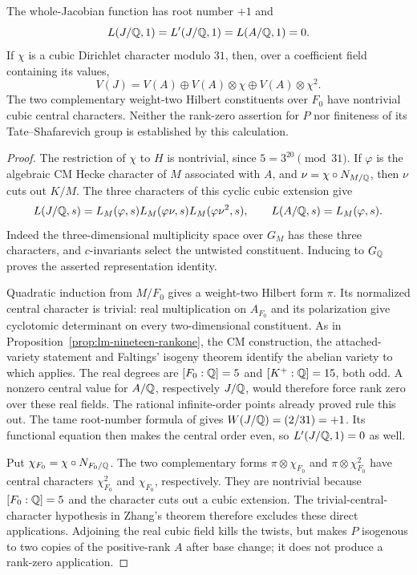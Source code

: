 \begin{proposition}
\label{prop:thirtyone-central-obstruction}
The whole-Jacobian function has root number $+1$ and
\[
 L(J/\mathbb Q,1)=L'(J/\mathbb Q,1)=L(A/\mathbb Q,1)=0.
\]
If $\chi$ is a cubic Dirichlet character modulo $31$, then,
over a coefficient field containing its values,
\[
 V(J)=V(A)\oplus V(A)\otimes\chi\oplus V(A)\otimes\chi^2.
\]
The two complementary weight-two Hilbert constituents over $F_0$
have nontrivial cubic central characters. Neither the rank-zero
assertion for $P$ nor finiteness of its Tate--Shafarevich group
is established by this calculation.
\end{proposition}
\begin{proof}
The restriction of $\chi$ to $H$ is nontrivial, since
$5=3^{20}\pmod{31}$. If $\varphi$ is the algebraic CM Hecke
character of $M$ associated with $A$, and
$\nu=\chi\circ N_{M/\mathbb Q}$, then $\nu$ cuts out $K/M$.
The three characters of this cyclic cubic extension give
\[
 L(J/\mathbb Q,s)=L_M(\varphi,s)L_M(\varphi\nu,s)
                            L_M(\varphi\nu^2,s),\qquad
 L(A/\mathbb Q,s)=L_M(\varphi,s).
\]
Indeed the three-dimensional multiplicity space over $G_M$
has these three characters, and $c$-invariants select the
untwisted constituent. Inducing to $G_\mathbb Q$ proves the asserted
representation identity.

Quadratic induction from $M/F_0$ gives a weight-two Hilbert
form $\pi$. Its normalized central character is trivial:
real multiplication on $A_{F_0}$ and its polarization give
cyclotomic determinant on every two-dimensional constituent.
As in Proposition~\ref{prop:lm-nineteen-rankone},
the CM construction, the attached-variety statement and Faltings'
isogeny theorem identify the abelian variety to which
\citet[Theorem~A, p.~28]{Zhang2001} applies.
The real degrees are $[F_0:\mathbb Q]=5$ and $[K^+:\mathbb Q]=15$, both
odd. A nonzero central value for $A/\mathbb Q$, respectively $J/\mathbb Q$,
would therefore force rank zero over these real fields.
The rational infinite-order points already proved rule this
out. The tame root-number formula
of \citet[Theorem~3.13 and the tame case in \S5]{ShuExpanded2021}
gives $W(J/\mathbb Q)=(2/31)=+1$.
Its functional equation then makes the central order even,
so $L'(J/\mathbb Q,1)=0$ as well.

Put $\chi_{F_0}=\chi\circ N_{F_0/\mathbb Q}$.
The two complementary forms $\pi\otimes\chi_{F_0}$ and
$\pi\otimes\chi_{F_0}^2$ have central characters
$\chi_{F_0}^2$ and $\chi_{F_0}$, respectively.
They are nontrivial because $[F_0:\mathbb Q]=5$ and the character
cuts out a cubic extension. The trivial-central-character
hypothesis in Zhang's theorem therefore excludes these direct
applications. Adjoining the real cubic field kills the twists,
but makes $P$ isogenous to two copies of the positive-rank $A$
after base change; it does not produce a rank-zero application.
\end{proof}

